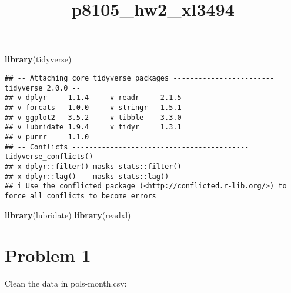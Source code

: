 \documentclass[
]{article}
\title{p8105\_hw2\_xl3494}
\author{}
\date{\vspace{-2.5em}}
\newenvironment{Shaded}{\begin{snugshade}}{\end{snugshade}}
\newcommand{\FunctionTok}[1]{\textcolor[rgb]{0.13,0.29,0.53}{\textbf{#1}}}
\newcommand{\NormalTok}[1]{#1}
\begin{document}
\maketitle

\begin{Shaded}
\begin{Highlighting}[]
\FunctionTok{library}\NormalTok{(tidyverse)}
\end{Highlighting}
\end{Shaded}

\begin{verbatim}
## -- Attaching core tidyverse packages ------------------------ tidyverse 2.0.0 --
## v dplyr     1.1.4     v readr     2.1.5
## v forcats   1.0.0     v stringr   1.5.1
## v ggplot2   3.5.2     v tibble    3.3.0
## v lubridate 1.9.4     v tidyr     1.3.1
## v purrr     1.1.0     
## -- Conflicts ------------------------------------------ tidyverse_conflicts() --
## x dplyr::filter() masks stats::filter()
## x dplyr::lag()    masks stats::lag()
## i Use the conflicted package (<http://conflicted.r-lib.org/>) to force all conflicts to become errors
\end{verbatim}

\begin{Shaded}
\begin{Highlighting}[]
\FunctionTok{library}\NormalTok{(lubridate)}
\FunctionTok{library}\NormalTok{(readxl)}
\end{Highlighting}
\end{Shaded}

\section{Problem 1}\label{problem-1}

Clean the data in pols-month.csv:
\end{document}

